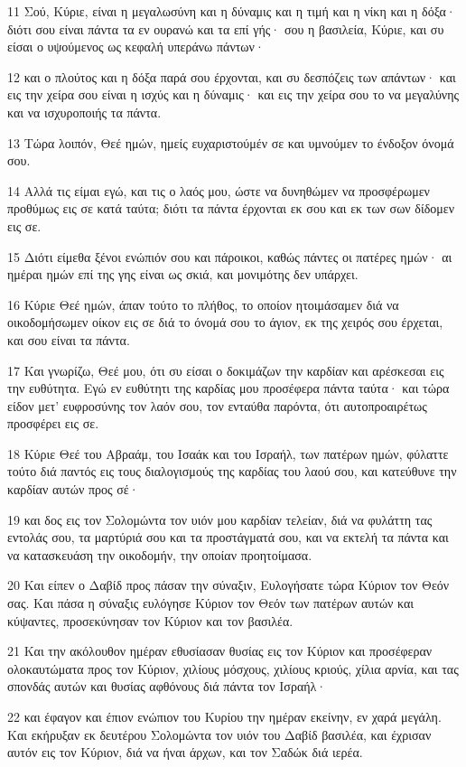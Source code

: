 \par 11 Σού, Κύριε, είναι η μεγαλωσύνη και η δύναμις και η τιμή και η νίκη και η δόξα· διότι σου είναι πάντα τα εν ουρανώ και τα επί γής· σου η βασιλεία, Κύριε, και συ είσαι ο υψούμενος ως κεφαλή υπεράνω πάντων·
\par 12 και ο πλούτος και η δόξα παρά σου έρχονται, και συ δεσπόζεις των απάντων· και εις την χείρα σου είναι η ισχύς και η δύναμις· και εις την χείρα σου το να μεγαλύνης και να ισχυροποιής τα πάντα.
\par 13 Τώρα λοιπόν, Θεέ ημών, ημείς ευχαριστούμέν σε και υμνούμεν το ένδοξον όνομά σου.
\par 14 Αλλά τις είμαι εγώ, και τις ο λαός μου, ώστε να δυνηθώμεν να προσφέρωμεν προθύμως εις σε κατά ταύτα; διότι τα πάντα έρχονται εκ σου και εκ των σων δίδομεν εις σε.
\par 15 Διότι είμεθα ξένοι ενώπιόν σου και πάροικοι, καθώς πάντες οι πατέρες ημών· αι ημέραι ημών επί της γης είναι ως σκιά, και μονιμότης δεν υπάρχει.
\par 16 Κύριε Θεέ ημών, άπαν τούτο το πλήθος, το οποίον ητοιμάσαμεν διά να οικοδομήσωμεν οίκον εις σε διά το όνομά σου το άγιον, εκ της χειρός σου έρχεται, και σου είναι τα πάντα.
\par 17 Και γνωρίζω, Θεέ μου, ότι συ είσαι ο δοκιμάζων την καρδίαν και αρέσκεσαι εις την ευθύτητα. Εγώ εν ευθύτητι της καρδίας μου προσέφερα πάντα ταύτα· και τώρα είδον μετ' ευφροσύνης τον λαόν σου, τον ενταύθα παρόντα, ότι αυτοπροαιρέτως προσφέρει εις σε.
\par 18 Κύριε Θεέ του Αβραάμ, του Ισαάκ και του Ισραήλ, των πατέρων ημών, φύλαττε τούτο διά παντός εις τους διαλογισμούς της καρδίας του λαού σου, και κατεύθυνε την καρδίαν αυτών προς σέ·
\par 19 και δος εις τον Σολομώντα τον υιόν μου καρδίαν τελείαν, διά να φυλάττη τας εντολάς σου, τα μαρτύριά σου και τα προστάγματά σου, και να εκτελή τα πάντα και να κατασκευάση την οικοδομήν, την οποίαν προητοίμασα.
\par 20 Και είπεν ο Δαβίδ προς πάσαν την σύναξιν, Ευλογήσατε τώρα Κύριον τον Θεόν σας. Και πάσα η σύναξις ευλόγησε Κύριον τον Θεόν των πατέρων αυτών και κύψαντες, προσεκύνησαν τον Κύριον και τον βασιλέα.
\par 21 Και την ακόλουθον ημέραν εθυσίασαν θυσίας εις τον Κύριον και προσέφεραν ολοκαυτώματα προς τον Κύριον, χιλίους μόσχους, χιλίους κριούς, χίλια αρνία, και τας σπονδάς αυτών και θυσίας αφθόνους διά πάντα τον Ισραήλ·
\par 22 και έφαγον και έπιον ενώπιον του Κυρίου την ημέραν εκείνην, εν χαρά μεγάλη. Και εκήρυξαν εκ δευτέρου Σολομώντα τον υιόν του Δαβίδ βασιλέα, και έχρισαν αυτόν εις τον Κύριον, διά να ήναι άρχων, και τον Σαδώκ διά ιερέα.
